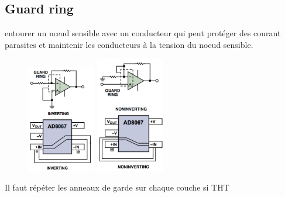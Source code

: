 \documentclass[resume]{subfiles}
\begin{document}
\begin{multicols}{3}
\subsection{Guard ring}
entourer un nœud sensible avec un conducteur qui peut protéger des courant parasites et maintenir les conducteurs à la tension du noeud sensible. \\
\begin{figure}[H]
\centering
\includegraphics[width=3.00cm]{img_18.png}
\includegraphics[width=3.00cm]{img_19.png}
\end{figure}
Il faut répéter les anneaux de garde sur chaque couche si THT

\end{multicols}
\end{document}
